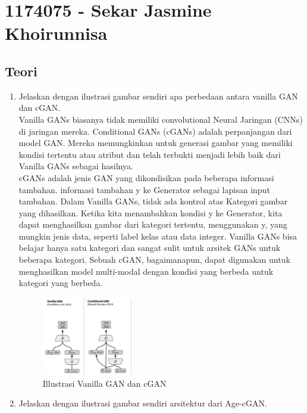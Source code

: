 \section{1174075 - Sekar Jasmine Khoirunnisa}

\subsection{Teori}
\begin{enumerate}
	\item Jelaskan dengan ilustrasi gambar sendiri apa perbedaan antara vanilla GAN dan cGAN.\\
	Vanilla GANs biasanya tidak memiliki convolutional Neural Jaringan (CNNs) di jaringan mereka.
Conditional GANs (cGANs) adalah perpanjangan dari model GAN. Mereka memungkinkan untuk generasi gambar yang memiliki kondisi tertentu atau atribut dan telah terbukti menjadi lebih baik dari Vanilla GANs sebagai hasilnya. \\
cGANs adalah jenis GAN yang dikondisikan pada beberapa informasi tambahan.  informasi tambahan y ke Generator sebagai lapisan input tambahan. Dalam Vanilla GANs, tidak ada kontrol atas Kategori gambar yang dihasilkan. Ketika kita menambahkan kondisi y ke Generator, kita dapat menghasilkan gambar dari kategori tertentu, menggunakan y, yang mungkin jenis data, seperti label kelas atau data integer. Vanilla GANs bisa belajar hanya satu kategori dan sangat sulit untuk arsitek GANs untuk beberapa kategori. Sebuah cGAN, bagaimanapun, dapat digunakan untuk menghasilkan model multi-modal dengan kondisi yang berbeda untuk kategori yang berbeda.

	\hfill \break
	\begin{figure}[H]
		\includegraphics[width=4cm]{figures/1174075/9/1.jpg}
		\centering
		\caption{Illustrasi Vanilla GAN dan cGAN}
	\end{figure}
	\item Jelaskan dengan ilustrasi gambar sendiri arsitektur dari Age-cGAN.
	\hfill \break
	

\end{enumerate}
